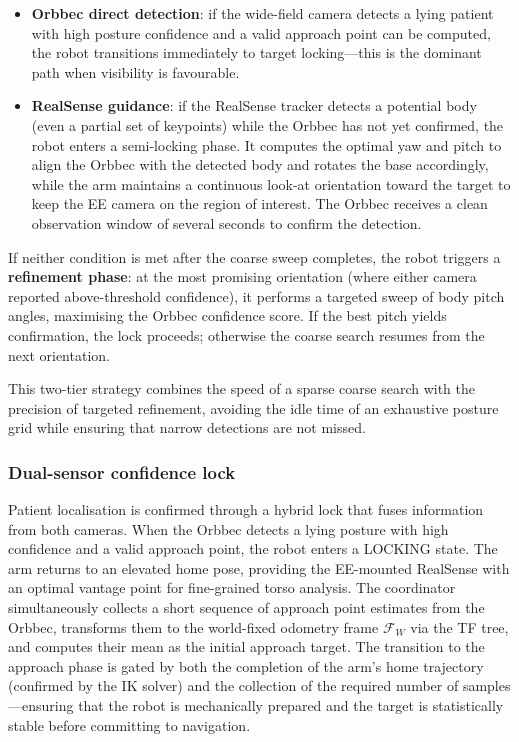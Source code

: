 \begin{itemize}
  \item \textbf{Orbbec direct detection}: if the wide-field camera detects a
        lying patient with high posture confidence and a valid approach
        point can be computed, the robot transitions immediately to target
        locking---this is the dominant path when visibility is favourable.
  \item \textbf{RealSense guidance}: if the RealSense tracker detects a
        potential body (even a partial set of keypoints) while the Orbbec
        has not yet confirmed, the robot enters a semi-locking phase. It
        computes the optimal yaw and pitch to align the Orbbec with the
        detected body and rotates the base accordingly, while the arm
        maintains a continuous look-at orientation toward the target to keep
        the \ac{EE} camera on the region of interest. The Orbbec receives a
        clean observation window of several seconds to confirm the detection.
\end{itemize}

If neither condition is met after the coarse sweep completes, the robot
triggers a \textbf{refinement phase}: at the most promising orientation
(where either camera reported above-threshold confidence), it performs a
targeted sweep of body pitch angles, maximising the Orbbec confidence score.
If the best pitch yields confirmation, the lock proceeds; otherwise the
coarse search resumes from the next orientation.

This two-tier strategy combines the speed of a sparse coarse search with the
precision of targeted refinement, avoiding the idle time of an exhaustive
posture grid while ensuring that narrow detections are not missed.

\subsubsection{Dual-sensor confidence lock}

Patient localisation is confirmed through a hybrid lock that fuses
information from both cameras. When the Orbbec detects a lying posture with
high confidence and a valid approach point, the robot enters a LOCKING state.
The arm returns to an elevated home pose, providing the \ac{EE}-mounted
RealSense with an optimal vantage point for fine-grained torso analysis. The
coordinator simultaneously collects a short sequence of approach point
estimates from the Orbbec, transforms them to the world-fixed odometry frame
$\mathcal{F}_W$ via the \ac{TF} tree, and computes their mean as the initial
approach target. The transition to the approach phase is gated by both the
completion of the arm's home trajectory (confirmed by the \ac{IK} solver)
and the collection of the required number of samples---ensuring that the
robot is mechanically prepared and the target is statistically stable before
committing to navigation.


